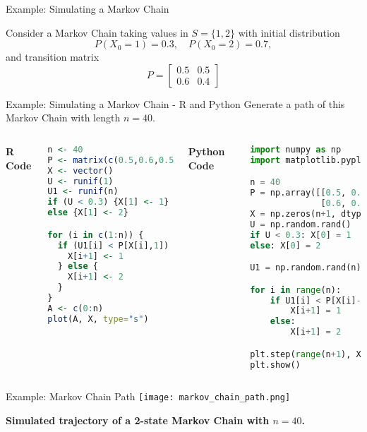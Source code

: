 \documentclass[8pt]{beamer}
\begin{document}
\begin{frame}[fragile]{Example: Simulating a Markov Chain}

Consider a Markov Chain taking values in $S=\{1,2\}$ with initial distribution 
\[
P(X_0=1)=0.3, \quad P(X_0=2)=0.7,
\]
and transition matrix
\[
P = \begin{bmatrix} 
0.5 & 0.5 \\ 
0.6 & 0.4 
\end{bmatrix}
\]
\end{frame}

\begin{frame}[fragile]{Example: Simulating a Markov Chain - R and Python}
Generate a path of this Markov Chain with length $n=40$.

\vspace{2mm}

\begin{columns}[t]
\textbf{R Code}
\begin{lstlisting}[language=R]
n <- 40
P <- matrix(c(0.5,0.6,0.5,0.4),2,2)
X <- vector()
U <- runif(1)
U1 <- runif(n)
if (U < 0.3) {X[1] <- 1} 
else {X[1] <- 2}

for (i in c(1:n)) {
  if (U1[i] < P[X[i],1]) {
    X[i+1] <- 1
  } else {
    X[i+1] <- 2
  }
}
A <- c(0:n)
plot(A, X, type="s")
\end{lstlisting}

\textbf{Python Code}
\begin{lstlisting}[language=Python]
import numpy as np
import matplotlib.pyplot as plt

n = 40
P = np.array([[0.5, 0.5],
              [0.6, 0.4]])
X = np.zeros(n+1, dtype=int)
U = np.random.rand()
if U < 0.3: X[0] = 1
else: X[0] = 2

U1 = np.random.rand(n)

for i in range(n):
    if U1[i] < P[X[i]-1, 0]:
        X[i+1] = 1
    else:
        X[i+1] = 2

plt.step(range(n+1), X)
plt.show()
\end{lstlisting}
\end{columns}
\end{frame}

\begin{frame}{Example: Markov Chain Path}
\centering
\texttt{[image: markov\_chain\_path.png]}

\vspace{3mm}
\textbf{Simulated trajectory of a 2-state Markov Chain with $n=40$.}
\end{frame}
\end{document}
